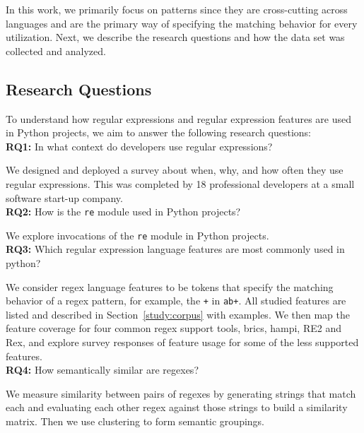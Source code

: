 In this work, we primarily focus on patterns since they are cross-cutting across languages and are the primary way of specifying the matching behavior for every utilization. Next, we describe the research questions and how the data set was collected and analyzed.

\subsection{Research Questions}
\label{sec:rqs}
To understand how regular expressions and regular expression features are used in Python projects, we aim to answer the following research questions:\\

\noindent \textbf{RQ1:} In what context do developers use regular expressions?

We designed and deployed a survey about when, why, and how often they use regular expressions. This was completed by 18 professional developers at a small software start-up company.\\

\noindent \textbf{RQ2:} How  is the {\tt re} module used in Python projects?

We explore invocations of  the {\tt re} module in  Python projects.\\


\noindent \textbf{RQ3:} Which regular expression language features are most commonly used in python?

We consider regex language features to be tokens that specify the matching behavior of a regex pattern, for example,  the {\tt +} in {\tt ab+}.  All studied features are listed and described in Section~\ref{study:corpus} with examples. We then map the feature coverage for four common regex support tools, brics, hampi, RE2 and Rex, and explore survey responses of feature usage for some of the less supported features.\\

\noindent \textbf{RQ4:} How semantically similar are regexes?

We measure similarity between pairs of regexes by generating strings that match each and evaluating each other regex against those strings to build a similarity matrix. Then we use clustering to form semantic groupings. \\

%

